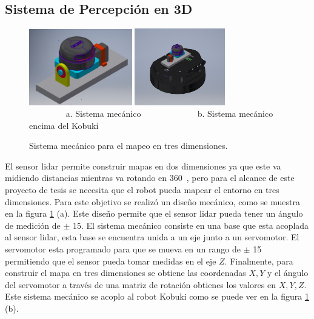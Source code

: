\subsection{Sistema de Percepci\'on en 3D}
\begin{figure}%
  \centering \footnotesize
  \includegraphics[width=0.40\textwidth]{images/lidar_3D.jpeg}
  \includegraphics[width=0.35\textwidth]{images/kbki_lidar3D.jpeg}
  \\ $\qquad\qquad$ a. Sistema mecánico  $\qquad\qquad\qquad$  b. Sistema mecánico encima del Kobuki
  \captionsetup{font=footnotesize}
  \caption{Sistema mec\'anico para el mapeo en tres dimensiones.}
  \label{f:lidar3D}
\end{figure}
El sensor lidar permite construir mapas en dos dimensiones ya que este va midiendo 
distancias mientras va rotando en 360\grad ~, pero para el alcance de este proyecto de 
tesis se necesita que el robot pueda mapear el entorno en tres dimensiones. Para este
objetivo se realizó un diseño mecánico, como se muestra en la figura \ref{f:lidar3D} (a). Este
diseño permite que el sensor lidar pueda tener un ángulo de medición de $\pm$ 15\grad. El sistema
mecánico consiste en una base que esta acoplada al sensor lidar, esta base se encuentra unida
a un eje junto a un servomotor. El servomotor esta programado para que se mueva en un rango de
$\pm$ 15\grad~ permitiendo que el sensor pueda tomar medidas en el eje $Z$. Finalmente, para construir
el mapa en tres dimensiones se obtiene las coordenadas $X,Y$ y el ángulo del servomotor a través de 
una matriz de rotación obtienes los valores en $X,Y,Z$. Este sistema mecánico se acoplo al robot Kobuki
como se puede ver en la figura \ref{f:lidar3D} (b).
